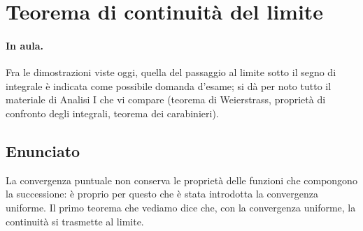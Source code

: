
\section{Teorema di continuità del limite}

\paragraph{In aula.} Fra le dimostrazioni viste oggi, quella del passaggio al limite
sotto il segno di integrale è indicata come possibile domanda d'esame; si dà per
noto tutto il materiale di Analisi I che vi compare (teorema di Weierstrass,
proprietà di confronto degli integrali, teorema dei carabinieri).

\subsection{Enunciato}

La convergenza puntuale non conserva le proprietà delle funzioni che compongono la
successione: è proprio per questo che è stata introdotta la convergenza uniforme. Il
primo teorema che vediamo dice che, con la convergenza uniforme, la continuità si
trasmette al limite.



